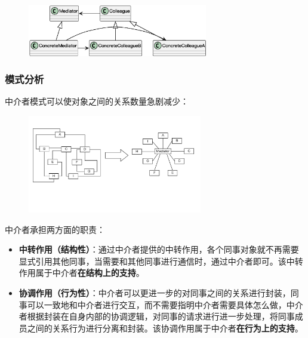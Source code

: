 \begin{figure}[H]
    \vspace{-0.5em}
	\centering
	\includegraphics[width=0.7\textwidth]{images/中介者模式结构.eps}
    \vspace{-1em}
\end{figure}

\subsubsection{模式分析}
中介者模式可以使对象之间的关系数量急剧减少：
\begin{figure}[H]
    \vspace{-0.5em}
	\centering
	\includegraphics[width=0.68\textwidth]{images/中介者模式分析.pdf}
    \vspace{-1em}
\end{figure}

中介者承担两方面的职责：
\begin{itemize}
    \item \textbf{中转作用（结构性）}：通过中介者提供的中转作用，各个同事对象就不再需要显式引用其他同事，当需要和其他同事进行通信时，通过中介者即可。该中转作用属于中介者\textbf{在结构上的支持}。
    \item \textbf{协调作用（行为性）}：中介者可以更进一步的对同事之间的关系进行封装，同事可以一致地和中介者进行交互，而不需要指明中介者需要具体怎么做，中介者根据封装在自身内部的协调逻辑，对同事的请求进行进一步处理，将同事成员之间的关系行为进行分离和封装。该协调作用属于中介者\textbf{在行为上的支持}。
\end{itemize}

